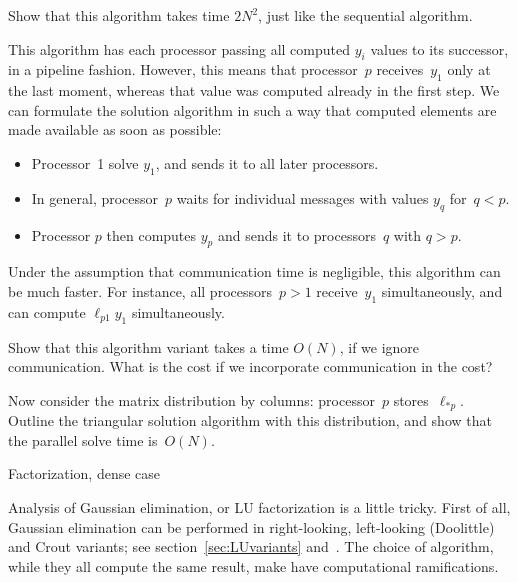 \begin{exercise}
  Show that this algorithm takes time $2N^2$, just like the sequential algorithm.
\end{exercise}

This algorithm has each processor passing all computed $y_i$ values to its successor, in a pipeline fashion.
However, this means that processor~$p$ receives~$y_1$ only at the last moment, whereas that value was computed
already in the first step. We can formulate the solution algorithm in such a way that computed elements
are made available as soon as possible:
\begin{itemize}
\item Processor~1 solve $y_1$, and sends it to all later processors.
\item In general, processor~$p$ waits for individual messages with values $y_q$ for~$q<p$.
\item Processor $p$ then computes $y_p$ and sends it to processors~$q$ with $q>p$.
\end{itemize}

Under the assumption that communication time is negligible, this algorithm can be much faster.
For instance, all processors~$p>1$ receive~$y_1$ simultaneously, and can compute $\ell_{p1}y_1$
simultaneously.

\begin{exercise}
  Show that this algorithm variant takes a time $O(N)$,
  if we ignore communication.
  What is the cost if we incorporate communication in the cost?
\end{exercise}

\begin{exercise}
  Now consider the matrix distribution by columns: processor~$p$ stores~$\ell_{*p}$.
  Outline the triangular solution algorithm with this distribution, and show that the
  parallel solve time is~$O(N)$.
\end{exercise}


 {Factorization, dense case}
\label{sec:LUscaling}

Analysis of Gaussian elimination, or LU factorization
is a little tricky.
First of all, 
Gaussian elimination can be performed in right-looking,
left-looking (Doolittle) and Crout variants;
see section~\ref{sec:LUvariants} and~\cite{TSoPMC}.
The choice of algorithm,
while they all compute the same result,
make have computational ramifications.

